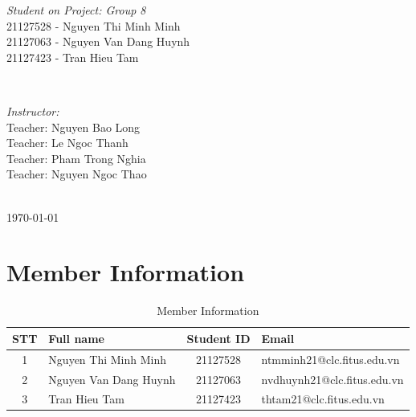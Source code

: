 \documentclass[13pt]{article}
\begin{document}
\begin{titlepage}
    \begin{minipage}[t]{0.5\textwidth}
        \begin{flushleft} \large
            \emph{Student on Project: Group 8}\\
            \large 21127528 - Nguyen Thi Minh Minh \\
            \large 21127063 - Nguyen Van Dang Huynh \\
            \large 21127423 - Tran Hieu Tam
        \end{flushleft}
    \end{minipage}
    ~
    \begin{minipage}[t]{0.4\textwidth}
        \begin{flushright} \large
            \emph{Instructor: } \\
            \large Teacher: Nguyen Bao Long \\
            \large Teacher: Le Ngoc Thanh \\
            \large Teacher: Pham Trong Nghia \\
            \large Teacher: Nguyen Ngoc Thao
        \end{flushright}
    \end{minipage}\\[5 cm]
    
    {\large \today}\\[1cm]

    \vfill
\end{titlepage}

\newpage
\tableofcontents

\newpage
\section{Member Information}

\renewcommand{\arraystretch}{1.5} 

\begin{table}[h]
    \centering
    \begin{tabular}{|c|p{5cm}|c|p{6cm}|}
    \hline
       \textbf{STT} & \textbf{Full name} & \textbf{Student ID} & \textbf{Email} \\
    \hline
        1 & Nguyen Thi Minh Minh & 21127528 & ntmminh21@clc.fitus.edu.vn \\
    \hline
        2 & Nguyen Van Dang Huynh & 21127063 & nvdhuynh21@clc.fitus.edu.vn \\
    \hline
        3 & Tran Hieu Tam & 21127423 & thtam21@clc.fitus.edu.vn \\
    \hline
    \end{tabular}
    \caption{Member Information}
    \label{tab:mytable}
\end{table}
\end{document}
